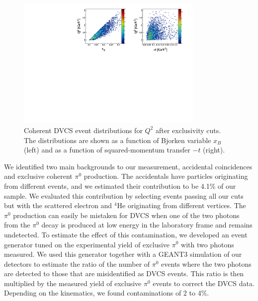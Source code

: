 \documentclass[twocolumn,nofootinbib,showpacs,prl,superscriptaddress,secnumarabic,amssymb,nobibnotes,aps,floatfix]{revtex4}
\begin{document}
\begin{figure}[tb]
\hspace{-0.45cm}
\includegraphics[width=9cm]{figs/F_Q2_xB_t_Coh.pdf}
\caption{Coherent DVCS event distributions for $Q^2$ after exclusivity cuts. 
The distributions are shown as a function of Bjorken variable $x_B$ (left) 
and as a function of squared-momentum transfer $-t$ (right).}
\label{fig:kin-coverage}
\end{figure}

We identified two main backgrounds to our measurement, accidental coincidences 
and exclusive coherent
$\pi^0$ production. The accidentals have particles originating from different events,
and we estimated their contribution to be 4.1\% of our sample. We evaluated this 
contribution by selecting events passing all our cuts but with the scattered electron and 
$^4$He originating from different vertices. The $\pi^0$ production can easily
be mistaken for DVCS when one of the two photons from the $\pi^0$ 
decay is produced at low energy in the laboratory frame and remains undetected.  
To estimate the effect of this contamination, we developed an event generator 
tuned on the experimental yield of exclusive $\pi^0$ with two photons measured. 
We used this generator together with a GEANT3 simulation of our 
detectors to estimate the ratio of the number of $\pi^0$ events where the 
two photons are detected to those that are misidentified as DVCS events. This 
ratio is then multiplied by the measured yield of exclusive $\pi^0$ events to 
correct the DVCS data. Depending on the kinematics, we found contaminations of 
2 to 4\%. 
\end{document}
